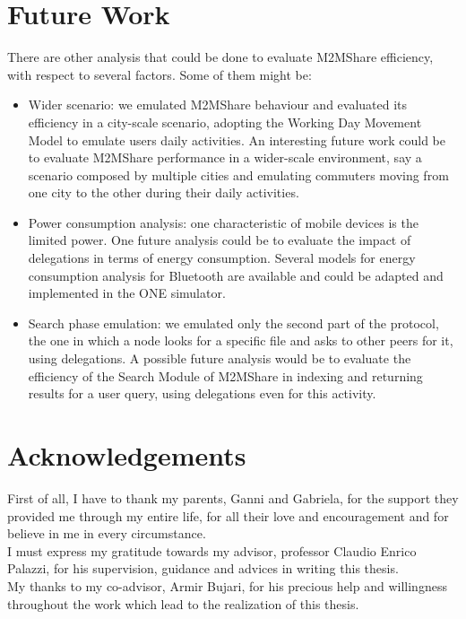 \pagebreak
\section{Future Work}
There are other analysis that could be done to evaluate M2MShare efficiency, with respect to several factors. Some of them might be:
\begin{itemize}
\item Wider scenario: we emulated M2MShare behaviour and evaluated its efficiency in a city-scale scenario, adopting the Working Day Movement Model to emulate users daily activities. An interesting future work could be to evaluate M2MShare performance in a wider-scale environment, say a scenario composed by multiple cities and emulating commuters moving from one city to the other during their daily activities.
\item Power consumption analysis: one characteristic of mobile devices is the limited power. One future analysis could be to evaluate the impact of delegations in terms of energy consumption. Several models for  energy consumption analysis for Bluetooth are available and could be adapted and implemented in the ONE simulator.
\item Search phase emulation: we emulated only the second part of the protocol, the one in which a node looks for a specific file and asks to other peers for it, using delegations. A possible future analysis would be to evaluate the efficiency of the Search Module of M2MShare in indexing and returning results for a user query, using delegations even for this activity.
\end{itemize}

\newpage
\section{Acknowledgements}
First of all, I have to thank my parents, Ganni and Gabriela, for the support they provided me through my entire life, for all their love and encouragement and for believe in me in every circumstance.\\

I must express my gratitude towards my advisor, professor Claudio Enrico Palazzi, for his supervision, guidance and advices in writing this thesis. \\

My thanks to my co-advisor, Armir Bujari, for his precious help and willingness throughout the work which lead to the realization of this thesis.\\

